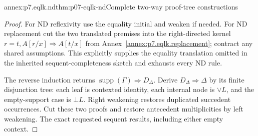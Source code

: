 \begin{annexitem}{annex:p7.eqlk.nd}{thm:p07-eqlk-nd}{Complete two-way proof-tree constructions}
\begin{proof}
For ND reflexivity use the equality initial and weaken if needed.
For ND replacement cut the two translated premises into the
right-directed kernel \(r=t,A[r/x]\Rightarrow A[t/x]\) from
Annex~\ref{annex:p7.eqlk.replacement}; contract any shared assumptions.
This explicitly supplies the equality translation omitted in the inherited
sequent-completeness sketch and exhausts every ND rule.

The reverse induction returns
\(\operatorname{supp}(\Gamma)\Rightarrow D_\Delta\).
Derive \(D_\Delta\Rightarrow\Delta\) by its finite disjunction tree:
each leaf is contexted identity, each internal node is \(\lor L\),
and the empty-support case is \(\bot L\). Right weakening restores
duplicated succedent occurrences. Cut these two proofs and restore
antecedent multiplicities by left weakening. The exact requested
sequent results, including either empty context.
\end{proof}
\end{annexitem}

